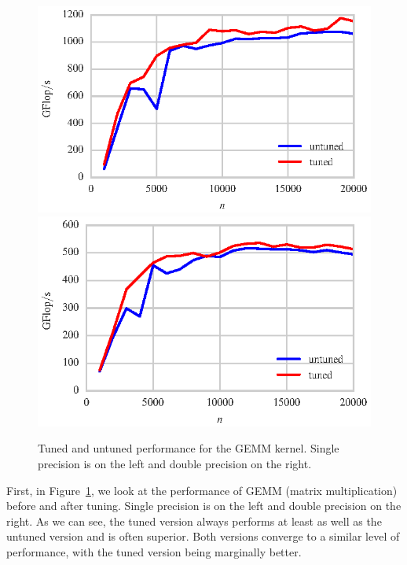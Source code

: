 \documentclass[a4paper,12pt]{article}
\begin{document}
\begin{figure}[ht]
  \centering
  \includegraphics[scale=0.85]{fig/tuned_sgemm.eps}
  \includegraphics[scale=0.85]{fig/tuned_dgemm.eps}
  \caption{Tuned and untuned performance for the GEMM kernel. Single
    precision is on the left and double precision on the right.
    \label{fig.tuned_gemm} }
\end{figure}
First, in Figure~\ref{fig.tuned_gemm},
we look at the performance of GEMM (matrix multiplication)
before and after tuning.
Single precision is on the left and double precision on the right.
As we can see,
the tuned version always performs at least as well as
the untuned version and is often superior.
Both versions converge to a similar level of performance,
with the tuned version being marginally better.
\end{document}
